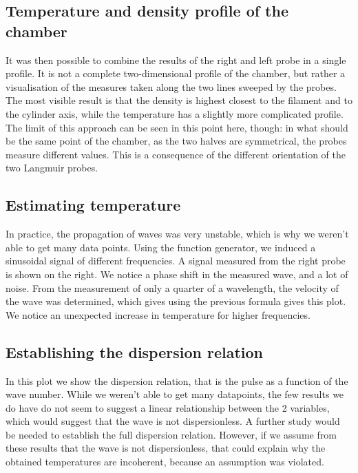 \subsection{Temperature and density profile of the chamber}
It was then possible to combine the results of the right and left probe in a single profile. It is not a complete two-dimensional profile of the chamber, but rather a visualisation of the measures taken along the two lines sweeped by the probes.
The most visible result is that the density is highest closest to the filament and to the cylinder axis, while the temperature has a slightly more complicated profile.
The limit of this approach can be seen in this point here, though: in what should be the same point of the chamber, as the two halves are symmetrical, the probes measure different values. This is a consequence of the different orientation of the two Langmuir probes.

\subsection{Estimating temperature}
In practice, the propagation of waves was very unstable, which is why we weren't able to get many data points. Using the function generator, we induced a sinusoidal signal of different frequencies. A signal measured from the right probe is shown on the right. We notice a phase shift in the measured wave, and a lot of noise. From the measurement of only a quarter of a wavelength, the velocity of the wave was determined, which gives using the previous formula gives this plot. We notice an unexpected increase in temperature for higher frequencies.

\subsection{Establishing the dispersion relation}
In this plot we show the dispersion relation, that is the pulse as a function of the wave number. While we weren't able to get many datapoints, the few results we do have do not seem to suggest a linear relationship between the 2 variables, which would suggest that the wave is not dispersionless. A further study would be needed to establish the full dispersion relation. However, if we assume from these results that the wave is not dispersionless, that could explain why the obtained temperatures are incoherent, because an assumption was violated.
